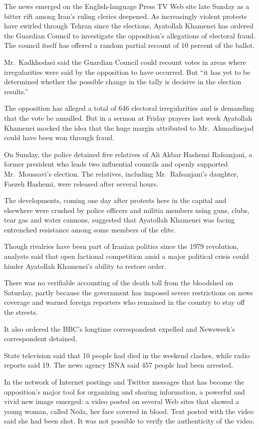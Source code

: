 ﻿\documentclass[12pt,a4paper,onecolumn]{article}
\begin{document}
The news emerged on the English-language Press TV Web site late Sunday as a bitter rift among Iran's
ruling clerics deepened. As increasingly violent protests have swirled through Tehran since the
elections, Ayatollah Khamenei has ordered the Guardian Council to investigate the opposition's
allegations of electoral fraud. The council itself has offered a random partial recount of 10
percent of the ballot.

Mr.~Kadkhodaei said the Guardian Council could recount votes in areas where irregularities were said
by the opposition to have occurred. But ``it has yet to be determined whether the possible change in
the tally is decisive in the election results.''

The opposition has alleged a total of 646 electoral irregularities and is demanding that the vote be
annulled. But in a sermon at Friday prayers last week Ayatollah Khamenei mocked the idea that the
huge margin attributed to Mr.~Ahmadinejad could have been won through fraud.

On Sunday, the police detained five relatives of Ali Akbar Hashemi Rafsanjani, a former president
who leads two influential councils and openly supported Mr.~Moussavi's election. The relatives,
including Mr.~Rafsanjani's daughter, Faezeh Hashemi, were released after several hours.

The developments, coming one day after protests here in the capital and elsewhere were crushed by
police officers and militia members using guns, clubs, tear gas and water cannons, suggested that
Ayatollah Khamenei was facing entrenched resistance among some members of the elite.

Though rivalries have been part of Iranian politics since the 1979 revolution, analysts said that
open factional competition amid a major political crisis could hinder Ayatollah Khamenei's ability
to restore order.

There was no verifiable accounting of the death toll from the bloodshed on Saturday, partly because
the government has imposed severe restrictions on news coverage and warned foreign reporters who
remained in the country to stay off the streets.

It also ordered the BBC's longtime correspondent expelled and Newsweek's correspondent detained.

State television said that 10 people had died in the weekend clashes, while radio reports said 19.
The news agency ISNA said 457 people had been arrested.

In the network of Internet postings and Twitter messages that has become the opposition's major tool
for organizing and sharing information, a powerful and vivid new image emerged: a video posted on
several Web sites that showed a young woman, called Neda, her face covered in blood. Text posted
with the video said she had been shot. It was not possible to verify the authenticity of the video.
\end{document}
